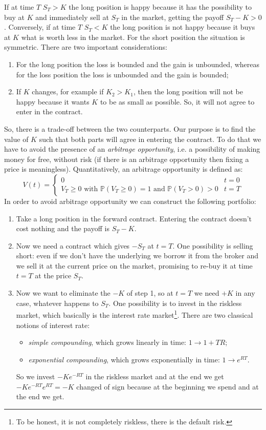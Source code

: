 If at time $T$ $S_T>K$ the long position is happy because it has the possibility to buy at $K$ and immediately sell at $S_T$ in the market, getting the payoff $S_T-K>0$. Conversely, if at time $T$ $S_T<K$ the long position is not happy because it buys at $K$ what is worth less in the market. For the short position the situation is symmetric. There are two important considerations:
\begin{enumerate}
    \item For the long position the loss is bounded and the gain is unbounded, whereas for the loss position the loss is unbounded and the gain is bounded;
    \item If $K$ changes, for example if $K_2>K_1$, then the long position will not be happy because it wants $K$ to be as small as possible. So, it will not agree to enter in the contract.
\end{enumerate}
So, there is a trade-off between the two counterparts. Our purpose is to find the value of $K$ such that both parts will agree in entering the contract. To do that we have to avoid the presence of an \emph{arbitrage opportunity}, i.e. a possibility of making money for free, without risk (if there is an arbitrage opportunity then fixing a price is meaningless). Quantitatively, an arbitrage opportunity is defined as:
\begin{equation}
    V(t) = \begin{cases}
    0 & t = 0\\
    V_T\ge0 \mbox{ with } \mathbb{P}(V_T\ge0)=1 \mbox{ and } \mathbb{P}(V_T>0)>0 & t=T
    \end{cases}
\end{equation}
In order to avoid arbitrage opportunity we can construct the following portfolio:
\begin{enumerate}
    \item Take a long position in the forward contract. Entering the contract doesn't cost nothing and the payoff is $S_T-K$.
    \item Now we need a contract which gives $-S_T$ at $t=T$. One possibility is selling short: even if we don't have the underlying we borrow it from the broker and we sell it at the current price on the market, promising to re-buy it at time $t=T$ at the price $S_T$.
    \item Now we want to eliminate the $-K$ of step 1, so at $t=T$ we need $+K$ in any case, whatever happens to $S_T$. One possibility is to invest in the riskless market, which basically is the interest rate market\footnote{To be honest, it is not completely riskless, there is the default risk.}. There are two classical notions of interest rate:
    \begin{itemize}
        \item \emph{simple compounding}, which grows linearly in time: $1\to 1+TR$;
        \item \emph{exponential compounding}, which grows exponentially in time: $1\to e^{RT}$.
    \end{itemize}
    So we invest $-Ke^{-RT}$ in the riskless market and at the end we get $-Ke^{-RT}e^{RT}=-K$ changed of sign because at the beginning we spend and at the end we get.
\end{enumerate}

